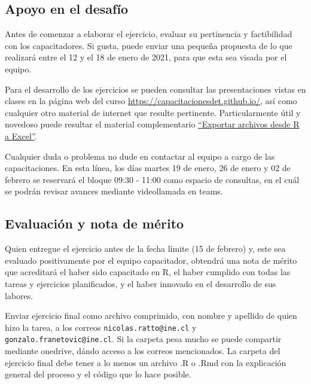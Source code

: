 \documentclass[
]{article}
\begin{document}
\hypertarget{apoyo-en-el-desafuxedo}{%
\subsection{Apoyo en el desafío}\label{apoyo-en-el-desafuxedo}}

Antes de comenzar a elaborar el ejercicio, evaluar su pertinencia y
factibilidad con los capacitadores. Si gusta, puede enviar una pequeña
propuesta de lo que realizará entre el 12 y el 18 de enero de 2021, para
que esta sea visada por el equipo.

Para el desarrollo de los ejercicios se pueden consultar las
presentaciones vistas en clases en la página web del curso
\url{https://capacitacionesdet.github.io/}, así como cualquier otro
material de internet que resulte pertinente. Particularmente útil y
novedoso puede resultar el material complementario
\href{https://capacitacionesdet.github.io/bonus1_openxlsx/\#1}{``Exportar
archivos desde R a Excel''}.

Cualquier duda o problema no dude en contactar al equipo a cargo de las
capacitaciones. En esta línea, los días martes 19 de enero, 26 de enero
y 02 de febrero se reservará el bloque 09:30 - 11:00 como espacio de
consultas, en el cuál se podrán revisar avances mediante videollamada en
teams.

\hypertarget{evaluaciuxf3n-y-nota-de-muxe9rito}{%
\subsection{Evaluación y nota de
mérito}\label{evaluaciuxf3n-y-nota-de-muxe9rito}}

Quien entregue el ejercicio antes de la fecha límite (15 de febrero) y,
este sea evaluado positivamente por el equipo capacitador, obtendrá una
nota de mérito que acreditará el haber sido capacitado en R, el haber
cumplido con todas las tareas y ejercicios planificados, y el haber
innovado en el desarrollo de sus labores.

Enviar ejercicio final como archivo comprimido, con nombre y apellido de
quien hizo la tarea, a los correos \texttt{nicolas.ratto@ine.cl} y
\texttt{gonzalo.franetovic@ine.cl}. Si la carpeta pesa mucho se puede
compartir mediante onedrive, dándo acceso a los correos mencionados. La
carpeta del ejercicio final debe tener a lo menos un archivo .R o .Rmd
con la explicación general del proceso y el código que lo hace posible.
\end{document}
